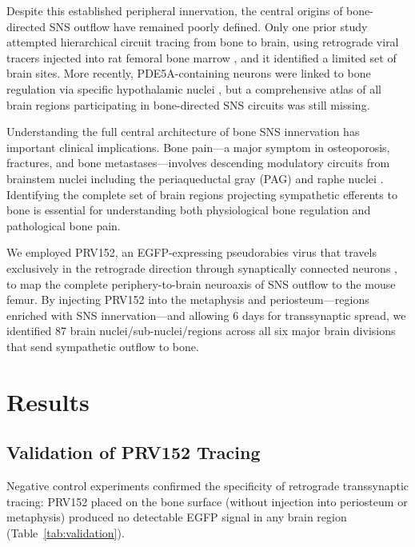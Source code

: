 \documentclass[11pt]{article}
\begin{document}
Despite this established peripheral innervation, the central origins of bone-directed SNS outflow have remained poorly defined. Only one prior study attempted hierarchical circuit tracing from bone to brain, using retrograde viral tracers injected into rat femoral bone marrow \citep{brazill2019nerves}, and it identified a limited set of brain sites. More recently, PDE5A-containing neurons were linked to bone regulation via specific hypothalamic nuclei \citep{schiller2021central}, but a comprehensive atlas of all brain regions participating in bone-directed SNS circuits was still missing.

Understanding the full central architecture of bone SNS innervation has important clinical implications. Bone pain---a major symptom in osteoporosis, fractures, and bone metastases---involves descending modulatory circuits from brainstem nuclei including the periaqueductal gray (PAG) and raphe nuclei \citep{shi2020bone, brazill2019nerves}. Identifying the complete set of brain regions projecting sympathetic efferents to bone is essential for understanding both physiological bone regulation and pathological bone pain.

We employed PRV152, an EGFP-expressing pseudorabies virus that travels exclusively in the retrograde direction through synaptically connected neurons \citep{card2011pseudorabies, smith2005pseudorabies}, to map the complete periphery-to-brain neuroaxis of SNS outflow to the mouse femur. By injecting PRV152 into the metaphysis and periosteum---regions enriched with SNS innervation---and allowing 6 days for transsynaptic spread, we identified 87 brain nuclei/sub-nuclei/regions across all six major brain divisions that send sympathetic outflow to bone.

\section{Results}

\subsection{Validation of PRV152 Tracing}

Negative control experiments confirmed the specificity of retrograde transsynaptic tracing: PRV152 placed on the bone surface (without injection into periosteum or metaphysis) produced no detectable EGFP signal in any brain region (Table~\ref{tab:validation}).
\end{document}
